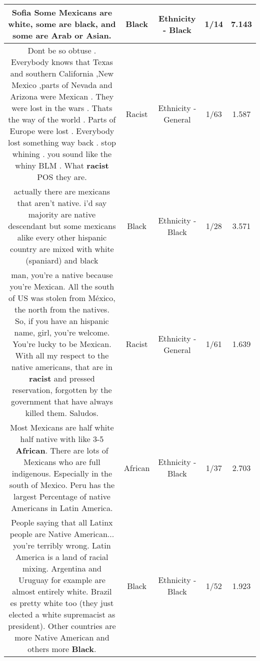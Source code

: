 \documentclass[11pt]{article}
\newlength\mylength
\begin{document}
\begin{center}
\begin{longtable}{|C{.65\mylength}|C{.30\mylength}|C{.12\mylength}|C{.12\mylength}|C{.12\mylength}|}
  \small Sofia Some Mexicans are white, some are \textbf{black},  and some are Arab or Asian.\normalsize   & Black & Ethnicity - Black & 1/14 & 7.143 \\  \hline
  \small Dont be so obtuse . Everybody knows that Texas and southern California ,New Mexico ,parts of Nevada and Arizona were Mexican . They were lost in the wars . Thats the way of the world . Parts of Europe  were lost . Everybody lost something way back . stop whining . you sound like the whiny BLM . What \textbf{racist} POS they are.\normalsize   & Racist & Ethnicity - General & 1/63 & 1.587 \\  \hline
  \small actually there are mexicans that aren't native. i'd say majority are native descendant but some mexicans alike every other hispanic country are mixed with white (spaniard) and black\normalsize   & Black & Ethnicity - Black & 1/28 & 3.571 \\  \hline
  \small man, you're a native because you're Mexican. All the south of US was stolen from México, the north from the natives. So, if you have an hispanic name, girl, you're welcome. You're lucky to be Mexican. With all my respect to the native americans, that are in \textbf{racist} and pressed reservation, forgotten by the government that have always killed them. Saludos.\normalsize   & Racist & Ethnicity - General & 1/61 & 1.639 \\  \hline
  \small Most Mexicans are half white half native with like 3-5 \textbf{African}. There are lots of Mexicans who are full indigenous. Especially in the south of Mexico. Peru has the largest Percentage of native Americans in Latin America.\normalsize   & African & Ethnicity - Black & 1/37 & 2.703 \\  \hline
  \small People saying that all Latinx people are Native American... you're terribly wrong. Latin America is a land of racial mixing. Argentina and Uruguay for example are almost entirely white. Brazil es pretty white too (they just elected a white supremacist as president). Other countries are more Native American and others more \textbf{Black}.\normalsize   & Black & Ethnicity - Black & 1/52 & 1.923 \\  \hline

\end{longtable}
\end{center}
\end{document}
